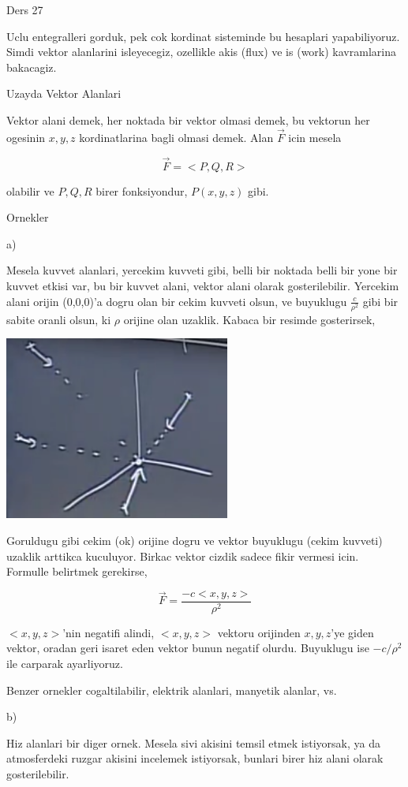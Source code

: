 \documentclass[12pt,fleqn]{article}\usepackage{../../common}
\begin{document}
Ders 27

Uclu entegralleri gorduk, pek cok kordinat sisteminde bu hesaplari
yapabiliyoruz. Simdi vektor alanlarini isleyecegiz, ozellikle akis (flux)
ve is (work) kavramlarina bakacagiz. 

Uzayda Vektor Alanlari

Vektor alani demek, her noktada bir vektor olmasi demek, bu vektorun
her ogesinin $x,y,z$ kordinatlarina bagli olmasi demek. Alan $\vec{F}$
icin mesela 

$$
\vec{F} = < P,Q,R >
$$

olabilir ve $P,Q,R$ birer fonksiyondur, $P(x,y,z)$ gibi. 

Ornekler

a)

Mesela kuvvet alanlari, yercekim kuvveti gibi, belli bir noktada belli
bir yone bir kuvvet etkisi var, bu bir kuvvet alani, vektor alani olarak
gosterilebilir. Yercekim alani orijin (0,0,0)'a dogru olan bir cekim kuvveti
olsun, ve buyuklugu $\frac{c}{\rho^2}$ gibi bir sabite oranli olsun, ki
$\rho$ orijine olan uzaklik. Kabaca bir resimde gosterirsek,

\includegraphics[width=20em]{calc_multi_27_01.png}

Goruldugu gibi cekim (ok) orijine dogru ve vektor buyuklugu (cekim kuvveti)
uzaklik arttikca kuculuyor. Birkac vektor cizdik sadece fikir vermesi
icin. Formulle belirtmek gerekirse,

$$
\vec{F} = \frac{-c < x,y,z >}{\rho^2}
$$

$< x,y,z >$'nin negatifi alindi, $< x,y,z >$ vektoru orijinden $x,y,z$'ye giden
vektor, oradan geri isaret eden vektor bunun negatif olurdu. Buyuklugu ise
$-c / \rho^2$ ile carparak ayarliyoruz. 

Benzer ornekler cogaltilabilir, elektrik alanlari, manyetik alanlar, vs.

b) 

Hiz alanlari bir diger ornek. Mesela sivi akisini temsil etmek istiyorsak,
ya da atmosferdeki ruzgar akisini incelemek istiyorsak, bunlari birer hiz alani
olarak gosterilebilir.
\end{document}
